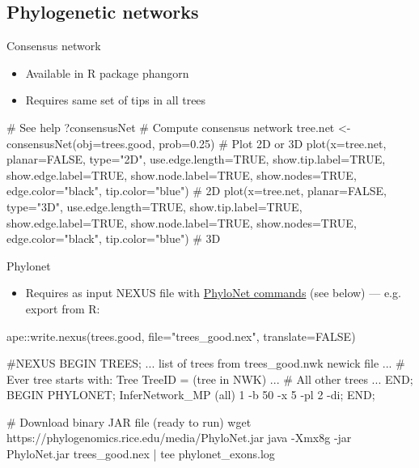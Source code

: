 \documentclass[compress,  xelatex, 11pt, xcolor=x11names, aspectratio=169,
	hyperref={
		bookmarks=true,
		unicode=true,
		colorlinks=true,
		pdftitle={HybSeq course},
		plainpages=false,
		pdfauthor={Vojtech Zeisek},
		pdfsubject={Practical processing of HybSeq target enrichment sequencing data on computing grids like MetaCentrum},
		pdfcreator={XeLaTeX},
		pdfkeywords={BASH, command line, GNU, HybSeq, Linux, MetaCentrum, sequencing shell, target enrichment},
		linkcolor=Turquoise4, %
		anchorcolor=DodgerBlue4, %
		citecolor=DodgerBlue4, %
		filecolor=DodgerBlue4, %
		menucolor=Tan4, %
		urlcolor=DarkOliveGreen4 %
		},
	url={hyphens, lowtilde} %
	]{beamer}
\renewcommand{\texttt}[1]{\colorbox{Cornsilk2}{{\ttfamily #1}}}
\begin{document}
\subsection{Phylogenetic networks}

\begin{frame}[fragile]{Consensus network}
	\begin{itemize}
		\item Available in \texttt{R} package \texttt{phangorn}
		\item Requires same set of tips in all trees
	\end{itemize}
	\begin{spluscode}
    # See help
    ?consensusNet
    # Compute consensus network
    tree.net <- consensusNet(obj=trees.good, prob=0.25)
    # Plot 2D or 3D
    plot(x=tree.net, planar=FALSE, type="2D", use.edge.length=TRUE,
      show.tip.label=TRUE, show.edge.label=TRUE, show.node.label=TRUE,
      show.nodes=TRUE, edge.color="black", tip.color="blue") # 2D
    plot(x=tree.net, planar=FALSE, type="3D", use.edge.length=TRUE,
      show.tip.label=TRUE, show.edge.label=TRUE, show.node.label=TRUE,
      show.nodes=TRUE, edge.color="black", tip.color="blue") # 3D
	\end{spluscode}
\end{frame}

\begin{frame}[fragile]{Phylonet}
	\begin{itemize}
		\item Requires as input NEXUS file with \href{https://wiki.rice.edu/confluence/display/PHYLONET/List+of+PhyloNet+Commands}{PhyloNet commands} (see below) --- e.g. export from \texttt{R}:
	\end{itemize}
	\begin{spluscode}
    ape::write.nexus(trees.good, file="trees_good.nex", translate=FALSE)
	\end{spluscode}
	\begin{bashcode}
    #NEXUS
    BEGIN TREES;
    ... list of trees from trees_good.nwk newick file ...
    # Ever tree starts with:
    Tree TreeID = (tree in NWK)
    ... # All other trees ...
    END;
    BEGIN PHYLONET;
    InferNetwork_MP (all) 1 -b 50 -x 5 -pl 2 -di;
    END;
	\end{bashcode}
	\begin{bashcode}
    # Download binary JAR file (ready to run)
    wget https://phylogenomics.rice.edu/media/PhyloNet.jar
    java -Xmx8g -jar PhyloNet.jar trees_good.nex | tee phylonet_exons.log
	\end{bashcode}
\end{frame}
\end{document}
